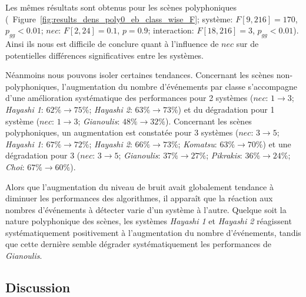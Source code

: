 Les mêmes résultats sont obtenus pour les scènes polyphoniques (\cf~Figure~\ref{fig:results_dens_poly0_eb_class_wise_F}; système: $F[9,216]=170$, $p_{gg}<0.01$; $nec$: $F[2,24]=0.1$, $p=0.9$; interaction: $F[18,216]=3$, $p_{gg}<0.01$). Ainsi ils nous est difficile de conclure quant à l'influence de $nec$ sur de potentielles différences significatives entre les systèmes.

Néanmoins nous pouvons isoler certaines tendances. Concernant les scènes non-polyphoniques, l'augmentation du nombre d'événements par classe s'accompagne d'une amélioration systématique des performances pour 2 systèmes ($nec$: $1\rightarrow 3$; \emph{Hayashi 1}: $62\%\rightarrow 75\%$; \emph{Hayashi 2}: $63\%\rightarrow 73\%$) et du dégradation pour 1 système ($nec$: $1\rightarrow 3$; \emph{Gianoulis}: $48\%\rightarrow 32\%$). Concernant les scènes polyphoniques, un augmentation est constatée pour 3 systèmes ($nec$: $3\rightarrow 5$; \emph{Hayashi 1}: $67\%\rightarrow 72\%$; \emph{Hayashi 2}: $66\%\rightarrow 73\%$; \emph{Komatsu}: $63\%\rightarrow 70\%$) et une dégradation pour 3 ($nec$: $3\rightarrow 5$; \emph{Gianoulis}: $37\%\rightarrow 27\%$; \emph{Pikrakis}: $36\%\rightarrow 24\%$; \emph{Choi}: $67\%\rightarrow 60\%$).

Alors que l'augmentation du niveau de bruit avait globalement tendance à diminuer les performances des algorithmes, il apparaît que la réaction aux nombres d'événements à détecter varie d'un système à l'autre. Quelque soit la nature polyphonique des scènes, les systèmes \emph{Hayashi 1} et \emph{Hayashi 2} réagissent systématiquement positivement à l'augmentation du nombre d'événements, tandis que cette dernière semble dégrader systématiquement les performances de \emph{Gianoulis}.

\subsection{Discussion}




